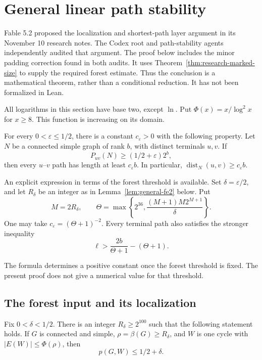 \section{General linear path stability}
\label{sec:general-linear-path-stability}

Fable 5.2 proposed the localization and shortest-path layer argument in its November 10 research notes.
The Codex root and path-stability agents independently audited that argument.
The proof below includes the minor padding correction found in both audits.
It uses Theorem~\ref{thm:research-marked-size} to supply the required forest estimate.
Thus the conclusion is a mathematical theorem, rather than a conditional reduction.
It has not been formalized in Lean.

All logarithms in this section have base two, except $\ln$.
Put $\Phi(x)=x/\log^2x$ for $x\ge8$.
This function is increasing on its domain.

\begin{theorem}\label{thm:general-linear-path-stability}
For every $0<\varepsilon\le1/2$, there is a constant $c_\varepsilon>0$ with the following property.
Let $N$ be a connected simple graph of rank $b$, with distinct terminals $u,v$.
If
\[
 P_{uv}(N)\ge(1/2+\varepsilon)2^b,
\]
then every $u$--$v$ path has length at least $c_\varepsilon b$.
In particular, $\operatorname{dist}_N(u,v)\ge c_\varepsilon b$.

An explicit expression in terms of the forest threshold is available.
Set $\delta=\varepsilon/2$, and let $R_\delta$ be an integer as in Lemma~\ref{lem:general-fe2} below.
Put
\[
 M=2R_\delta,\qquad
 \Theta=\max\left\{2^{36},\frac{(M+1)M2^{M+1}}{\delta}\right\}.
\]
One may take $c_\varepsilon=(\Theta+1)^{-2}$.
Every terminal path also satisfies the stronger inequality
\begin{equation}\label{eq:general-linear-strong}
 \ell>\frac{2b}{\Theta+1}-(\Theta+1).
\end{equation}
\end{theorem}

The formula determines a positive constant once the forest threshold is fixed.
The present proof does not give a numerical value for that threshold.

\subsection{The forest input and its localization}

\begin{lemma}\label{lem:general-fe2}
Fix $0<\delta<1/2$.
There is an integer $R_\delta\ge2^{100}$ such that the following statement holds.
If $G$ is connected and simple, $\rho=\beta(G)\ge R_\delta$, and $W$ is one cycle with
$|E(W)|\le\Phi(\rho)$, then
\[
 p(G,W)\le1/2+\delta.
\]
\end{lemma}

